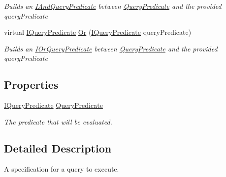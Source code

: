 \begin{DoxyCompactItemize}
\begin{DoxyCompactList}\small\item\em Builds an \hyperlink{interfaceCqrs_1_1Repositories_1_1Queries_1_1IAndQueryPredicate}{I\+And\+Query\+Predicate} between \hyperlink{classCqrs_1_1Repositories_1_1Queries_1_1QueryPredicate}{Query\+Predicate} and the provided {\itshape query\+Predicate}  \end{DoxyCompactList}\item 
virtual \hyperlink{interfaceCqrs_1_1Repositories_1_1Queries_1_1IQueryPredicate}{I\+Query\+Predicate} \hyperlink{classCqrs_1_1Repositories_1_1Queries_1_1QueryStrategy_a96f4657370c8cd0d20465d2855ea2fd7_a96f4657370c8cd0d20465d2855ea2fd7}{Or} (\hyperlink{interfaceCqrs_1_1Repositories_1_1Queries_1_1IQueryPredicate}{I\+Query\+Predicate} query\+Predicate)
\begin{DoxyCompactList}\small\item\em Builds an \hyperlink{interfaceCqrs_1_1Repositories_1_1Queries_1_1IOrQueryPredicate}{I\+Or\+Query\+Predicate} between \hyperlink{classCqrs_1_1Repositories_1_1Queries_1_1QueryPredicate}{Query\+Predicate} and the provided {\itshape query\+Predicate}  \end{DoxyCompactList}\end{DoxyCompactItemize}
\subsection*{Properties}
\begin{DoxyCompactItemize}
\item 
\hyperlink{interfaceCqrs_1_1Repositories_1_1Queries_1_1IQueryPredicate}{I\+Query\+Predicate} \hyperlink{classCqrs_1_1Repositories_1_1Queries_1_1QueryStrategy_a45d9ad6895a7e8c404ea64abab5242ec_a45d9ad6895a7e8c404ea64abab5242ec}{Query\+Predicate}
\begin{DoxyCompactList}\small\item\em The predicate that will be evaluated. \end{DoxyCompactList}\end{DoxyCompactItemize}


\subsection{Detailed Description}
A specification for a query to execute. 



